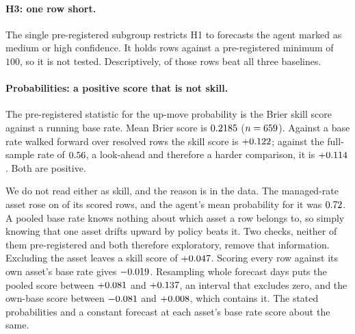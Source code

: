 \documentclass[11pt,a4paper]{article}
\begin{document}
\paragraph{H3: one row short.} The single pre-registered subgroup restricts H1
to forecasts the agent marked as medium or high confidence. It holds
\HThreeN{} rows against a pre-registered minimum of $100$, so it is not
tested. Descriptively, \HThreeK{} of those rows beat all three baselines.

\paragraph{Probabilities: a positive score that is not skill.} The
pre-registered statistic for the up-move probability is the Brier skill score
against a running base rate. Mean Brier score is $0.2185$
($n=659$). Against a base rate walked forward over resolved rows the skill
score is $+0.122$; against the full-sample rate of $0.56$, a
look-ahead and therefore a harder comparison, it is $+0.114$. Both are positive.

We do not read either as skill, and the reason is in the data. The
managed-rate asset rose on \FxUp{} of its \FxN{} scored rows, and the agent's
mean probability for it was $0.72$. A pooled base rate knows nothing
about which asset a row belongs to, so simply knowing that one asset drifts
upward by policy beats it. Two checks, neither of them pre-registered and both
therefore exploratory, remove that information. Excluding the asset leaves a
skill score of $+0.047$. Scoring every row against its own asset's base rate
gives $-0.019$. Resampling whole forecast days puts the pooled score
between $+0.081$ and $+0.137$, an interval that excludes zero, and the
own-base score between $-0.081$ and $+0.008$, which contains it. The
stated probabilities and a constant forecast at each asset's base rate score
about the same.
\end{document}
